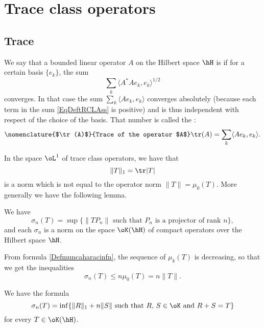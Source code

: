 \section{Trace class operators}

\subsection{Trace}

We say that a bounded linear operator $A$ on the Hilbert space $\hH$ is  if for a certain basis $\{ e_k \}$, the sum
\begin{equation}	\label{EqDeftRCLAss}
\sum_k\langle A^*Ae_k, e_k\rangle^{1/2}
\end{equation}
converges. In that case the sum $\sum_k\langle Ae_k, e_k\rangle $ converges absolutely (because each term in the sum \eqref{EqDeftRCLAss} is positive) and is thus independent with respect of the choice of the basis. That number is called the :
\begin{equation}\nomenclature{$\tr(A)$}{Trace of the operator $A$}
\tr(A)=\sum_k\langle Ae_k, e_k\rangle.
\end{equation}

In the space $\oL^1$ of trace class operators, we have that
\begin{equation}
\| T \|_1=\tr| T |
\end{equation}
is a norm which is not equal to the operator norm $\| T \|=\mu_0(T)$. More generally we have the following lemma.
\begin{lemma}
We have 
\begin{equation}
\sigma_n(T)=\sup\{ \| TP_n \|\text{ such that $P_n$ is a projector of rank $n$} \},
\end{equation}
and each $\sigma_n$ is a norm on the space $\oK(\hH)$ of compact operators over the Hilbert space $\hH$. 
\end{lemma}

From formula \eqref{Defmuncaharacinfn}, the sequence of $\mu_k(T)$ is decreasing, so that we get the inequalities 
\[ 
  \sigma_n(T)\leq n\mu_0(T)=n\| T \|.
\]

\begin{lemma}
We have the formula
\begin{equation}	\label{EqsigmainfRST}
\sigma_n(T)=\inf\{ \| R \|_1+n\| S \|\text{ such that $R$, $S\in\oK$ and $R+S=T$} \}
\end{equation}
for every $T\in\oK(\hH)$.
\end{lemma}

